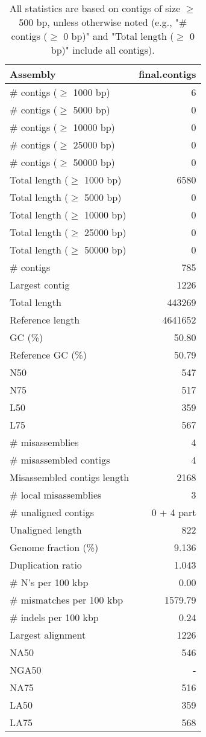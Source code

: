\documentclass[12pt,a4paper]{article}
\begin{document}
\begin{table}[ht]
\begin{center}
\caption{All statistics are based on contigs of size $\geq$ 500 bp, unless otherwise noted (e.g., "\# contigs ($\geq$ 0 bp)" and "Total length ($\geq$ 0 bp)" include all contigs).}
\begin{tabular}{|l*{1}{|r}|}
\hline
Assembly & final.contigs \\ \hline
\# contigs ($\geq$ 1000 bp) & 6 \\ \hline
\# contigs ($\geq$ 5000 bp) & 0 \\ \hline
\# contigs ($\geq$ 10000 bp) & 0 \\ \hline
\# contigs ($\geq$ 25000 bp) & 0 \\ \hline
\# contigs ($\geq$ 50000 bp) & 0 \\ \hline
Total length ($\geq$ 1000 bp) & 6580 \\ \hline
Total length ($\geq$ 5000 bp) & 0 \\ \hline
Total length ($\geq$ 10000 bp) & 0 \\ \hline
Total length ($\geq$ 25000 bp) & 0 \\ \hline
Total length ($\geq$ 50000 bp) & 0 \\ \hline
\# contigs & 785 \\ \hline
Largest contig & 1226 \\ \hline
Total length & 443269 \\ \hline
Reference length & 4641652 \\ \hline
GC (\%) & 50.80 \\ \hline
Reference GC (\%) & 50.79 \\ \hline
N50 & 547 \\ \hline
N75 & 517 \\ \hline
L50 & 359 \\ \hline
L75 & 567 \\ \hline
\# misassemblies & 4 \\ \hline
\# misassembled contigs & 4 \\ \hline
Misassembled contigs length & 2168 \\ \hline
\# local misassemblies & 3 \\ \hline
\# unaligned contigs & 0 + 4 part \\ \hline
Unaligned length & 822 \\ \hline
Genome fraction (\%) & 9.136 \\ \hline
Duplication ratio & 1.043 \\ \hline
\# N's per 100 kbp & 0.00 \\ \hline
\# mismatches per 100 kbp & 1579.79 \\ \hline
\# indels per 100 kbp & 0.24 \\ \hline
Largest alignment & 1226 \\ \hline
NA50 & 546 \\ \hline
NGA50 & - \\ \hline
NA75 & 516 \\ \hline
LA50 & 359 \\ \hline
LA75 & 568 \\ \hline
\end{tabular}
\end{center}
\end{table}
\end{document}
